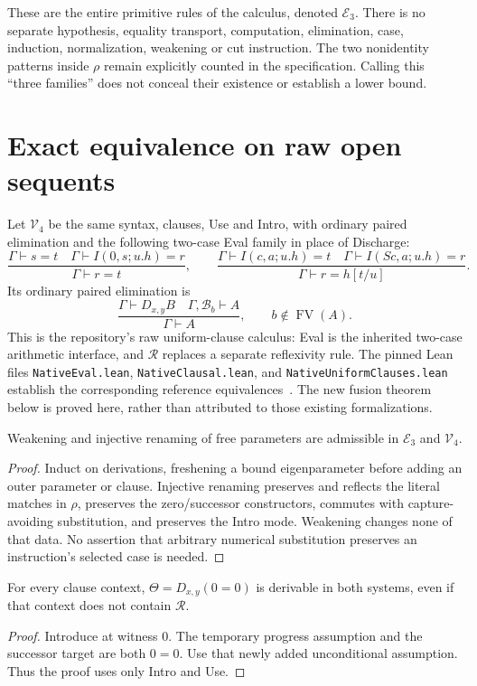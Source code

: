 These are the entire primitive rules of the calculus, denoted $\mathcal E_3$.
There is no separate hypothesis, equality transport, computation,
elimination, case, induction, normalization, weakening or cut instruction.
The two nonidentity patterns inside $\rho$ remain explicitly counted in
the specification. Calling this ``three families'' does not conceal their
existence or establish a lower bound.

\section{Exact equivalence on raw open sequents}
\label{sec:raw-equivalence}

Let $\mathcal V_4$ be the same syntax, clauses, Use and Intro, with ordinary
paired elimination and the following two-case Eval family in place of
Discharge:
\[
 \frac{\Gamma\vdash s=t\quad\Gamma\vdash I(0,s;u.h)=r}
      {\Gamma\vdash r=t},\qquad
 \frac{\Gamma\vdash I(c,a;u.h)=t\quad
       \Gamma\vdash I(Sc,a;u.h)=r}
      {\Gamma\vdash r=h[t/u]}.
\]
Its ordinary paired elimination is
\[
 \frac{\Gamma\vdash D_{x,y}B\quad
       \Gamma,\mathcal B_b\vdash A}
      {\Gamma\vdash A},\qquad b\notin\operatorname{FV}(A).
\]
This is the repository's raw uniform-clause calculus: Eval is the inherited
two-case arithmetic interface, and $\mathcal R$ replaces a separate
reflexivity rule. The pinned Lean files \texttt{NativeEval.lean},
\texttt{NativeClausal.lean}, and \texttt{NativeUniformClauses.lean}
establish the corresponding reference equivalences~\cite{repo,rawformal}.
The new fusion theorem below is proved here, rather than attributed to
those existing formalizations.

\begin{lemma}
\label{lem:raw-structural}
Weakening and injective renaming of free parameters are admissible in
$\mathcal E_3$ and $\mathcal V_4$.
\end{lemma}
\begin{proof}
Induct on derivations, freshening a bound eigenparameter before adding an
outer parameter or clause. Injective renaming preserves and reflects the
literal matches in $\rho$, preserves the zero/successor constructors,
commutes with capture-avoiding substitution, and preserves the Intro mode.
Weakening changes none of that data. No assertion that arbitrary numerical
substitution preserves an instruction's selected case is needed.
\end{proof}

\begin{lemma}
\label{lem:theta}
For every clause context, $\Theta=D_{x,y}(0=0)$ is derivable in both systems,
even if that context does not contain $\mathcal R$.
\end{lemma}
\begin{proof}
Introduce at witness $0$. The temporary progress assumption and the
successor target are both $0=0$. Use that newly added unconditional
assumption. Thus the proof uses only Intro and Use.
\end{proof}

